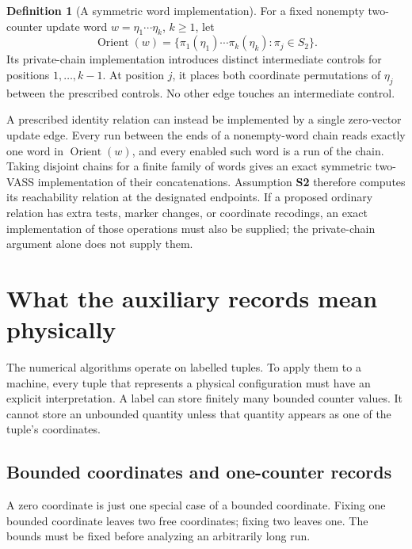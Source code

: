 \documentclass[11pt,a4paper]{article}
\theoremstyle{definition}
\newtheorem{definition}[theorem]{Definition}
\theoremstyle{remark}
\begin{document}
\begin{definition}[A symmetric word implementation]
\label{def:word-implementation}
For a fixed nonempty two-counter update word
\(w=\eta_1\cdots\eta_k\), \(k\ge1\), let
\[
 \operatorname{Orient}(w)
   =\{\pi_1(\eta_1)\cdots\pi_k(\eta_k):
                         \pi_j\in S_2\}.
\]
Its private-chain implementation introduces distinct intermediate
controls for positions \(1,\ldots,k-1\). At position \(j\), it places
both coordinate permutations of \(\eta_j\) between the prescribed
controls. No other edge touches an intermediate control.
\end{definition}

A prescribed identity relation can instead be implemented by a single
zero-vector update edge. Every run between the ends of a nonempty-word
chain reads exactly one word in
\(\operatorname{Orient}(w)\), and every enabled such word is a run of
the chain. Taking disjoint chains for a finite family of words gives
an exact symmetric two-VASS implementation of their concatenations.
Assumption \textbf{S2} therefore computes its reachability relation
at the designated endpoints. If a proposed ordinary relation has
extra tests, marker changes, or coordinate recodings, an exact
implementation of those operations must also be supplied; the
private-chain argument alone does not supply them.



\section{What the auxiliary records mean physically}
\label{sec:records}

The numerical algorithms operate on labelled tuples. To apply them to
a machine, every tuple that represents a physical configuration must
have an explicit interpretation. A label can store finitely many
bounded counter values. It cannot store an unbounded quantity unless
that quantity appears as one of the tuple's coordinates.

\subsection{Bounded coordinates and one-counter records}

A zero coordinate is just one special case of a bounded coordinate.
Fixing one bounded coordinate leaves two free coordinates; fixing two
leaves one. The bounds must be fixed before analyzing an arbitrarily
long run.
\end{document}
